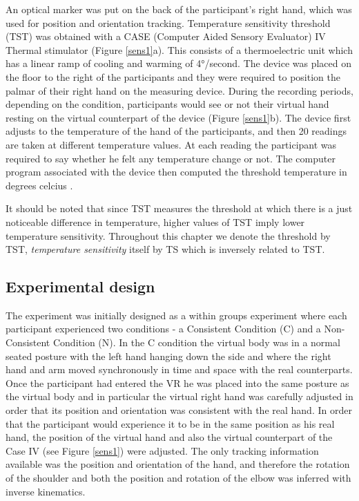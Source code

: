 \documentclass[
		twoside,openright,titlepage,numbers=noenddot,manychapters,
		headinclude,%
                footinclude=false,cleardoublepage=empty,
                BCOR=5mm,
		fontsize=11pt, %
                 enabledeprecatedfontcommands]{scrreprt}
\begin{document}
An optical marker was put on the back of the participant’s right hand, which was used for position and orientation tracking.
Temperature sensitivity threshold  (TST) was obtained with a CASE (Computer Aided Sensory Evaluator) IV Thermal stimulator (Figure \ref{sens1}a). This consists of a thermoelectric unit which has a linear ramp of cooling and warming of 4°/second. The device was placed on the floor to the right of the participants and they were required to position the palmar of their right hand on the measuring device.  During the recording periods, depending on the condition, participants would see or not their virtual hand resting on the virtual counterpart of the device (Figure \ref{sens1}b). The device first adjusts to the temperature of the hand of the participants, and then 20 readings are taken at different temperature values. At each reading the participant was required to say whether he felt any temperature change or not. The computer program associated with the device then computed the threshold temperature in degrees celcius \cite[]{Dyck1993a}.

It should be noted that since TST measures the threshold at which there is a just noticeable difference in temperature, higher values of TST imply lower temperature sensitivity. Throughout this chapter we denote the threshold by TST, \emph{temperature sensitivity} itself by TS which is inversely related to TST.


\subsection{Experimental design}

The experiment was initially designed as a within groups experiment where each participant experienced two conditions - a Consistent Condition (C) and a Non-Consistent Condition (N). In the C condition the virtual body was in a normal seated posture with the left hand hanging down the side and where the right hand and arm moved synchronously in time and space with the real counterparts. Once the participant had entered the VR he was placed into the same posture as the virtual body and in particular the virtual right hand was carefully adjusted in order that its position and orientation was consistent with the real hand. In order that the participant would experience it to be in the same position as his real hand, the position of the virtual hand and also the virtual counterpart of the Case IV (see Figure \ref{sens1}) were adjusted. The only tracking information available was the position and orientation of the hand, and therefore the rotation of the shoulder and both the position and rotation of the elbow was inferred with inverse kinematics.
\end{document}
